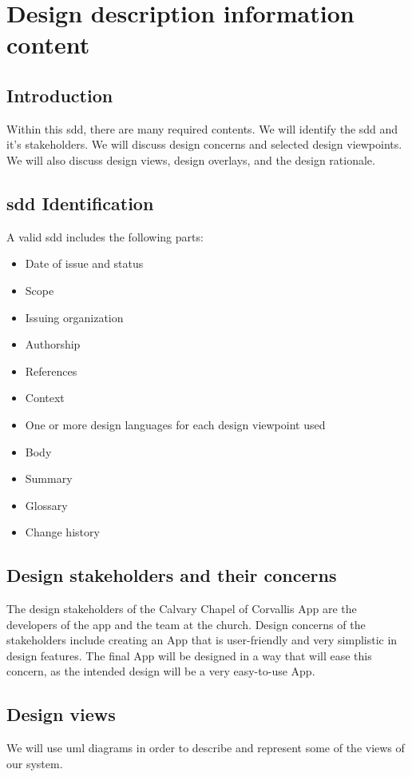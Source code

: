 \documentclass[letterpaper,10pt,draftclsnofoot,onecolumn,titlepage]{IEEEtran}
\begin{document}
	\section{Design description information content}

		\subsection{Introduction}
			Within this \gls{sdd}, there are many required contents.
			We will identify the \gls{sdd} and it's stakeholders.
			We will discuss design concerns and selected design viewpoints.
			We will also discuss design views, design overlays, and the design rationale.

		\subsection{\gls{sdd} Identification}
			A valid \gls{sdd} includes the following parts:
			\begin{itemize}
				\item{Date of issue and status}
				\item{Scope}
				\item{Issuing organization}
				\item{Authorship}
				\item{References}
				\item{Context}
				\item{One or more design languages for each design viewpoint used}
				\item{Body}
				\item{Summary}
				\item{Glossary}
				\item{Change history}
			\end{itemize}

		\subsection{Design stakeholders and their concerns}
			The design stakeholders of the Calvary Chapel of Corvallis \gls{App} are the developers of the app and the team at the church.
			Design concerns of the stakeholders include creating an \gls{App} that is user-friendly and very simplistic in design features.
			The final \gls{App} will be designed in a way that will ease this concern, as the intended design will be a very easy-to-use \gls{App}.

		\subsection{Design views}
		We will use \gls{uml} diagrams in order to describe and represent some of the views of our system.
\end{document}
